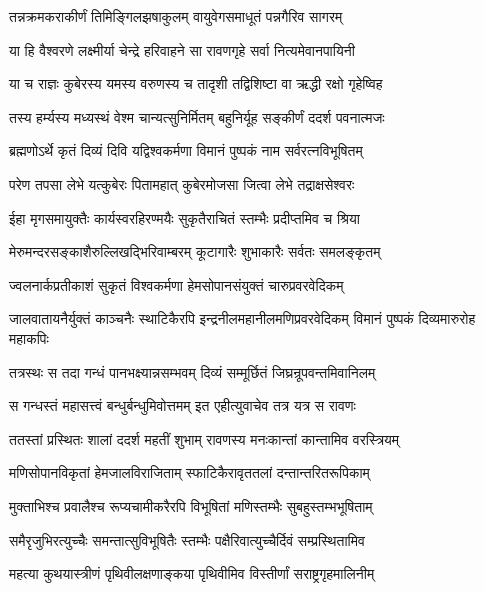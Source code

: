 \twolineshloka
{तन्नक्रमकराकीर्णं तिमिङ्गिलझषाकुलम्}
{वायुवेगसमाधूतं पन्नगैरिव सागरम्} %

\twolineshloka
{या हि वैश्वरणे लक्ष्मीर्या चेन्द्रे हरिवाहने}
{सा रावणगृहे सर्वा नित्यमेवानपायिनी} %

\twolineshloka
{या च राज्ञः कुबेरस्य यमस्य वरुणस्य च}
{तादृशी तद्विशिष्टा वा ऋद्धी रक्षो गृहेष्विह} %

\twolineshloka
{तस्य हर्म्यस्य मध्यस्थं वेश्म चान्यत्सुनिर्मितम्}
{बहुनिर्यूह सङ्कीर्णं ददर्श पवनात्मजः} %

\twolineshloka
{ब्रह्मणोऽर्थे कृतं दिव्यं दिवि यद्विश्वकर्मणा}
{विमानं पुष्पकं नाम सर्वरत्नविभूषितम्} %

\twolineshloka
{परेण तपसा लेभे यत्कुबेरः पितामहात्}
{कुबेरमोजसा जित्वा लेभे तद्राक्षसेश्वरः} %

\twolineshloka
{ईहा मृगसमायुक्तैः कार्यस्वरहिरण्मयैः}
{सुकृतैराचितं स्तम्भैः प्रदीप्तमिव च श्रिया} %

\twolineshloka
{मेरुमन्दरसङ्काशैरुल्लिखद्भिरिवाम्बरम्}
{कूटागारैः शुभाकारैः सर्वतः समलङ्कृतम्} %

\twolineshloka
{ज्वलनार्कप्रतीकाशं सुकृतं विश्वकर्मणा}
{हेमसोपानसंयुक्तं चारुप्रवरवेदिकम्} %

\threelineshloka
{जालवातायनैर्युक्तं काञ्चनैः स्थाटिकैरपि}
{इन्द्रनीलमहानीलमणिप्रवरवेदिकम्}
{विमानं पुष्पकं दिव्यमारुरोह महाकपिः} %

\twolineshloka
{तत्रस्थः स तदा गन्धं पानभक्ष्यान्नसम्भवम्}
{दिव्यं सम्मूर्छितं जिघ्रन्रूपवन्तमिवानिलम्} %

\twolineshloka
{स गन्धस्तं महासत्त्वं बन्धुर्बन्धुमिवोत्तमम्}
{इत एहीत्युवाचेव तत्र यत्र स रावणः} %

\twolineshloka
{ततस्तां प्रस्थितः शालां ददर्श महतीं शुभाम्}
{रावणस्य मनःकान्तां कान्तामिव वरस्त्रियम्} %

\twolineshloka
{मणिसोपानविकृतां हेमजालविराजिताम्}
{स्फाटिकैरावृततलां दन्तान्तरितरूपिकाम्} %

\twolineshloka
{मुक्ताभिश्च प्रवालैश्च रूप्यचामीकरैरपि}
{विभूषितां मणिस्तम्भैः सुबहुस्तम्भभूषिताम्} %

\twolineshloka
{समैरृजुभिरत्युच्चैः समन्तात्सुविभूषितैः}
{स्तम्भैः पक्षैरिवात्युच्चैर्दिवं सम्प्रस्थितामिव} %

\twolineshloka
{महत्या कुथयास्त्रीणं पृथिवीलक्षणाङ्कया}
{पृथिवीमिव विस्तीर्णां सराष्ट्रगृहमालिनीम्} %

